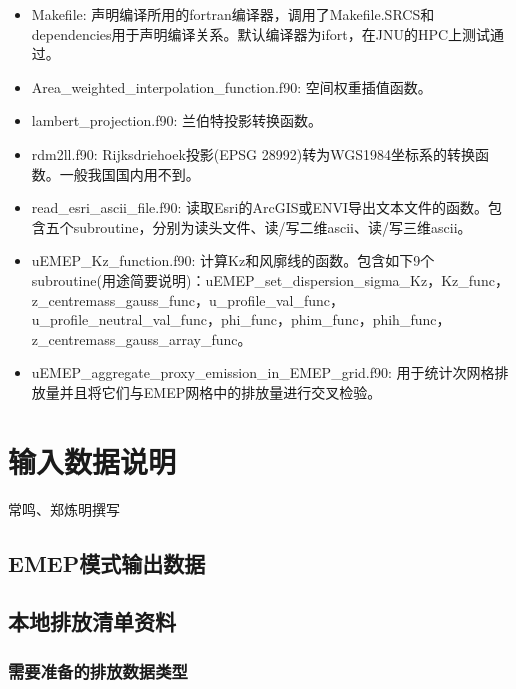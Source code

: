 \documentclass{article}
\begin{document}
\begin{itemize}

\item Makefile:
声明编译所用的fortran编译器，调用了Makefile.SRCS和dependencies用于声明编译关系。默认编译器为ifort，在JNU的HPC上测试通过。

\item Area\_weighted\_interpolation\_function.f90:
空间权重插值函数。

\item lambert\_projection.f90:
兰伯特投影转换函数。

\item rdm2ll.f90:
Rijksdriehoek投影(EPSG 28992)转为WGS1984坐标系的转换函数。一般我国国内用不到。

\item read\_esri\_ascii\_file.f90:
读取Esri的ArcGIS或ENVI导出文本文件的函数。包含五个subroutine，分别为读头文件、读/写二维ascii、读/写三维ascii。

\item uEMEP\_Kz\_function.f90:
	计算Kz和风廓线的函数。包含如下9个subroutine(用途简要说明)：uEMEP\_set\_dispersion\_sigma\_Kz，Kz\_func，z\_centremass\_gauss\_func，u\_profile\_val\_func，u\_profile\_neutral\_val\_func，phi\_func，phim\_func，phih\_func，z\_centremass\_gauss\_array\_func。

\item uEMEP\_aggregate\_proxy\_emission\_in\_EMEP\_grid.f90:
用于统计次网格排放量并且将它们与EMEP网格中的排放量进行交叉检验。

\end{itemize}

\section{输入数据说明}

{\color{red} 常鸣、郑炼明撰写}

\subsection{EMEP模式输出数据}

\subsection{本地排放清单资料}

\subsubsection{需要准备的排放数据类型}
\end{document}
